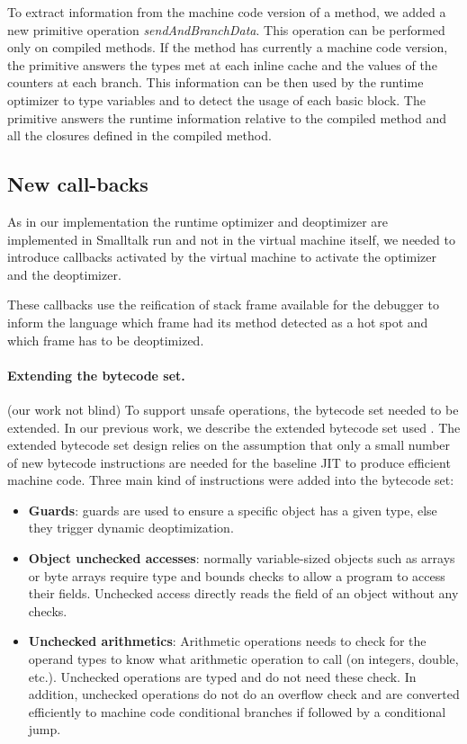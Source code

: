 \documentclass[a4paper,12pt,twoside]{../includes/ThesisStyle}
\begin{document}
To extract information from the machine code version of a method, we added a new primitive operation \emph{sendAndBranchData}. This operation can be performed only on compiled methods. If the method has currently a machine code version, the primitive answers the types met at each inline cache and the values of the counters at each branch. This information can be then used by the runtime optimizer to type variables and to detect the usage of each basic block. The primitive answers the runtime information relative to the compiled method and all the closures defined in the compiled method.

\subsection{New call-backs}

As in our implementation the runtime optimizer and deoptimizer are implemented in Smalltalk run and not in the virtual machine itself, we needed to introduce callbacks activated by the virtual machine to activate the optimizer and the deoptimizer. 

These callbacks use the reification of stack frame available for the debugger to inform the language which frame had its method detected as a hot spot and which frame has to be deoptimized.

\paragraph{Extending the bytecode set.}

(our work not blind)
To support unsafe operations, the bytecode set needed to be extended. In our previous work, we describe the extended bytecode set used \cite{Bera14a}. The extended bytecode set design relies on the assumption that only a small number of new bytecode instructions are needed for the baseline JIT to produce efficient machine code. Three main kind of instructions were added into the bytecode set:
\begin{itemize}
\item \textbf{Guards}: guards are used to ensure a specific object has a given type, else they trigger dynamic deoptimization.
\item \textbf{Object unchecked accesses}: normally variable-sized objects such as arrays or byte arrays require type and bounds checks to allow a program to access their fields. Unchecked access directly reads the field of an object without any checks.
\item \textbf{Unchecked arithmetics}: Arithmetic operations needs to check for the operand types to know what arithmetic operation to call (on integers, double, etc.). Unchecked operations are typed and do not need these check. In addition, unchecked operations do not do an overflow check and are converted efficiently to machine code conditional branches if followed by a conditional jump.
\end{itemize}
\end{document}
